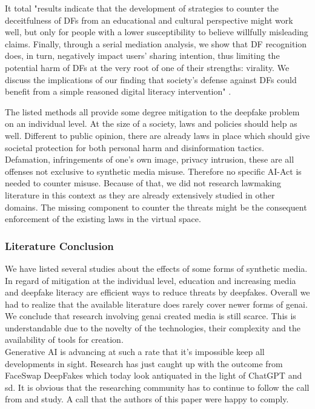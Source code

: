 \documentclass[
  a4paper,  %
  twoside,  %
  bibliography=totoc,
  headsepline,
  cleardoublepage=empty,
  parskip=half,
  draft=false
]{scrbook}
\begin{document}
It total "results indicate that the development of strategies to counter the deceitfulness of DFs from an educational and cultural perspective might work well, but only for people with a lower susceptibility to believe willfully misleading claims. Finally, through a serial mediation analysis, we show that DF recognition does, in turn, negatively impact users' sharing intention, thus limiting the potential harm of DFs at the very root of one of their strengths: virality. We discuss the implications of our finding that society's defense against DFs could benefit from a simple reasoned digital literacy intervention" \cite{iacobucciDeepfakesUnmaskedEffects2021}.

The listed methods all provide some degree mitigation to the deepfake problem on an individual level. At the size of a society, laws and policies should help as well. Different to public opinion, there are already laws in place which should give societal protection for both personal harm and disinformation tactics. Defamation, infringements of one's own image, privacy intrusion, these are all offenses not exclusive to synthetic media misuse. Therefore no specific AI-Act is needed to counter misuse. Because of that, we did not research lawmaking literature in this context as they are already extensively studied in other domains. The missing component to counter the threats might be the consequent enforcement of the existing laws in the virtual space. 

\subsubsection*{Literature Conclusion}
We have listed several studies about the effects of some forms of synthetic media. In regard of mitigation at the individual level, education and increasing media and deepfake literacy are efficient ways to reduce threats by deepfakes. Overall we had to realize that the available literature does rarely cover newer forms of \gls{genai}.
We conclude that research involving \gls{genai} created media is still scarce. This is understandable due to the novelty of the technologies, their complexity and the availability of tools for creation. \\
Generative AI is advancing at such a rate that it's impossible keep all developments in sight. Research has just caught up with the outcome from FaceSwap DeepFakes which today look antiquated in the light of ChatGPT and \gls{sd}. 
It is obvious that the researching community has to continue to follow the call from \citet{hancockSocialImpactDeepfakes2021} and study. A call that the authors of this paper were happy to comply.
\end{document}
